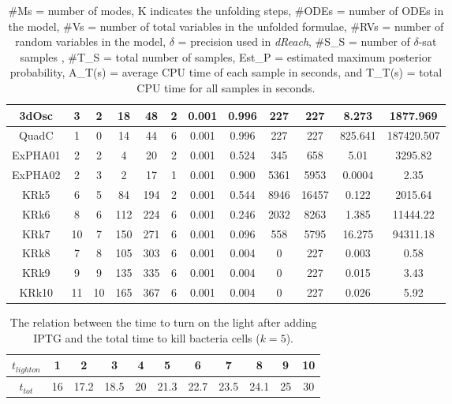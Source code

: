 \begin{center}
\begin{table*}[ht]
\begin{tabular}{c|c|c|c|c|c|c|c|c|c|c|c}
3dOsc & 3 & 2 & 18 & 48 & 2 & 0.001 & 0.996 & 227 & 227 & 8.273 & 1877.969 \\ \hline
QuadC & 1 & 0 & 14 & 44 & 6 & 0.001 & 0.996 & 227 & 227 & 825.641 & 187420.507 \\ \hline
ExPHA01 & 2 & 2 & 4 & 20 & 2 & 0.001 & 0.524 & 345 & 658 & 5.01 & 3295.82 \\ \hline
ExPHA02 &  2  &  3  & 2  & 17 & 1  &  0.001 &  0.900  & 5361 & 5953  & 0.0004   & 2.35  \\ \hline
KRk5 & 6   &  5  & 84  &194  & 2  &  0.001 &  0.544 & 8946   & 16457     &  0.122  & 2015.64  \\ \hline
KRk6 & 8   &  6  &112   &224  &  6 &  0.001 &  0.246  & 2032   & 8263     & 1.385   & 11444.22  \\ \hline
KRk7 & 10   &  7  & 150  &271  & 6  &  0.001 & 0.096 & 558   & 5795     & 16.275   & 94311.18  \\ \hline
KRk8 &  7  &  8  & 105  &303  & 6  &  0.001 &   0.004       &  0  & 227     & 0.003   & 0.58  \\ \hline
KRk9 &  9  &  9  & 135  & 335 & 6  &  0.001 &   0.004       & 0   & 227     & 0.015   &3.43   \\ \hline
KRk10 & 11   &  10  & 165  & 367 & 6  &  0.001 &  0.004        &0   &  227    & 0.026   &  5.92 \\ \hline
\end{tabular}
\caption {\#Ms = number of modes, K indicates the unfolding steps, \#ODEs = number of ODEs in the model, \#Vs = number of total variables in the unfolded formulae, \#RVs = number of random variables in the model, $\delta$ = precision used in {\it dReach}, \#S\_S = number of $\delta$-sat samples , \#T\_S = total number of samples, Est\_P = estimated maximum posterior probability,  A\_T(s) = average CPU time of each sample in seconds, and T\_T(s) = total CPU time for all samples in seconds.}
\label{table:additonalexp}
\end{table*}
\end{center}

\begin{table*}[th!]
\captionsetup{font=scriptsize}
\centering
    \begin{tabular}{|c|c|c|c|c|c|c|c|c|c|c|}
    \hline
    $t_{lighton}$ & 1 & 2 & 3 & 4 & 5 & 6 & 7 & 8 & 9 & 10 \\ \hline
    $t_{tot}$ & 16  & 17.2     &  18.5   & 20   & 21.3 & 22.7 & 23.5 & 24.1 & 25 & 30    \\ \hline
    \end{tabular}
    \caption{The relation between the time to turn on the light after adding IPTG and the total time to kill bacteria cells ($k=5$). }
    \label{table:kr02}
\end{table*}


